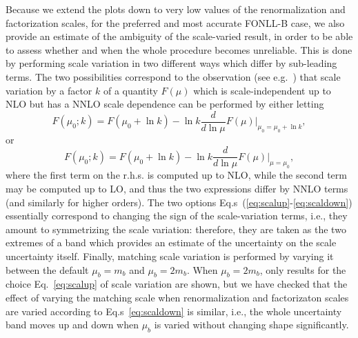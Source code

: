\documentclass[12pt]{article}
\begin{document}
Because we extend the plots down to very low values of the
renormalization and factorization scales, for the preferred 
and most accurate  FONLL-B case,
we also provide an estimate
of the ambiguity of the scale-varied result, in order to be able to
assess whether and when the whole procedure becomes unreliable. This is done by
performing scale variation in
two different ways which differ by sub-leading terms. 
The two possibilities correspond to the
observation (see e.g.~\cite{Altarelli:2008aj})
that scale variation by a factor $k$ 
of a quantity $F(\mu)$ which is scale-independent up to NLO but has a
NNLO scale dependence can be performed by either letting
\begin{equation}\label{eq:scalup}
  F(\mu_0;k)=F(\mu_0+\ln k)- \ln k \frac{d}{d\ln\mu}
  F(\mu)\Big|_{\mu_0=\mu_0+\ln k},
\end{equation}
or
\begin{equation}\label{eq:scaldown}
  F(\mu_0;k)=F(\mu_0+\ln k)- \ln k \frac{d}{d\ln\mu} F(\mu)\Big|_{\mu=\mu_0},
\end{equation}
where the first term on the r.h.s. is computed up to NLO, while the
second term may be computed up to LO, and thus the two expressions
differ by NNLO terms (and similarly for higher orders). The two
options Eq.s~(\ref{eq:scalup}-\ref{eq:scaldown}) essentially correspond to
changing the sign of the scale-variation terms, i.e., they amount to
symmetrizing the scale variation: therefore, they are taken as the two
extremes of a band which provides an estimate of the 
uncertainty
on the scale uncertainty itself.
Finally, matching scale variation is performed by varying it between the
default $\mu_b=m_b$ and $\mu_b=2m_b$. When  $\mu_b=2m_b$, only results
for the choice Eq.~\ref{eq:scalup} of scale variation are shown, but
we have checked that the effect of varying the  matching scale when
renormalization and factorizaton scales
are varied according to  Eq.s~\ref{eq:scaldown} is similar, i.e., the
whole uncertainty band moves up and down when $\mu_b$ is varied
without changing shape significantly.
\end{document}
